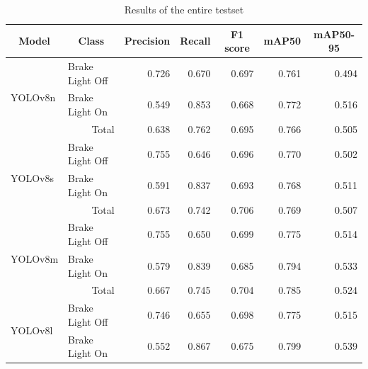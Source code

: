 \begin{table}[t!]
    \caption{Results of the entire testset}
    \label{tab:total}
    \begin{tabular}{llrrrrr}
    \toprule
    \multicolumn{1}{c}{Model} & \multicolumn{1}{c}{Class} & \multicolumn{1}{c}{Precision} & \multicolumn{1}{c}{Recall} & \multicolumn{1}{c}{F1 score} & \multicolumn{1}{c}{mAP50} & \multicolumn{1}{c}{mAP50-95} \\
    \midrule
    \multirow{3}{*}{YOLOv8n}  & Brake Light Off           & 0.726 & 0.670 & 0.697 & 0.761                     & 0.494                          \\
                              & Brake Light On            & 0.549 & 0.853 & 0.668 & 0.772                     & 0.516                        \\
                              & \multicolumn{1}{r}{Total} & 0.638 & 0.762 & 0.695 & 0.766                     & 0.505                        \\
    \midrule
    \multirow{3}{*}{YOLOv8s}  & Brake Light Off           & 0.755 & 0.646 & 0.696 & 0.770                     & 0.502                        \\
                              & Brake Light On            & 0.591 & 0.837 & 0.693 & 0.768                     & 0.511                        \\
                              & \multicolumn{1}{r}{Total} & 0.673 & 0.742 & 0.706 & 0.769                     & 0.507                        \\
    \midrule
    \multirow{3}{*}{YOLOv8m}  & Brake Light Off           & 0.755 & 0.650 & 0.699 & 0.775                     & 0.514                         \\
                              & Brake Light On            & 0.579 & 0.839 & 0.685 & 0.794                     & 0.533                        \\
                              & \multicolumn{1}{r}{Total} & 0.667 & 0.745 & 0.704 & 0.785                     & 0.524                        \\
    \midrule
    \multirow{3}{*}{YOLOv8l}  & Brake Light Off           & 0.746 & 0.655 & 0.698 & 0.775                     & 0.515                         \\
                              & Brake Light On            & 0.552 & 0.867 & 0.675 & 0.799                     & 0.539                        \\

\end{tabular}
\end{table}
